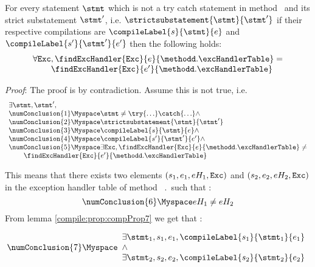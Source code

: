 \begin{compProp8}
  For every statement $\stmt$ which is not a try catch statement  in method \methodd \  and  its strict substatement $\stmt'$, i.e. 
$\strictsubstatement{\stmt}{\stmt'} $
if their respective compilations are  $\compileLabel{s}{\stmt}{e}$ and  $\compileLabel{s'}{\stmt'}{e'}$ then the following holds:
$$ \begin{array}{l}
          \forall \mbox{\rm\tt{Exc}}, \findExcHandler{\mbox{\rm\tt{Exc}} }{e}{\methodd.\excHandlerTable} = \\
	  \phantom{\forall \mbox{\rm\tt{Exc}} }\findExcHandler{\mbox{\rm\tt{Exc}} }{e'}{\methodd.\excHandlerTable} 
   \end{array}
$$

\end{compProp8}
\textit{Proof}:
The proof is by contradiction. Assume this is not true, i.e.
 $$\begin{array}{l} \exists \stmt, \stmt' ,   \\
       \numConclusion{1}    \Myspace \stmt \neq \try \{ \ldots \} \catch \{ \ldots \} \wedge \\
       \numConclusion{2}   \Myspace  \strictsubstatement{\stmt}{\stmt'} \\
       \numConclusion{3}  \Myspace  \compileLabel{s}{\stmt}{e} \wedge \\
       \numConclusion{4} \Myspace  \compileLabel{s'}{\stmt'}{e'} \wedge \\
       \numConclusion{5}  \Myspace \exists  \mbox{\rm\tt{Exc}}, \findExcHandler{\mbox{\rm\tt{Exc}} }{e}{\methodd.\excHandlerTable} \neq \\
                                            \phantom{\exists \mbox{\rm\tt{Exc}} }\findExcHandler{\mbox{\rm\tt{Exc}} }{e'}{\methodd.\excHandlerTable}    
\end{array}
$$

This means that there exists two elements $   (s_1,e_1, eH_1, \mbox{\rm\texttt{Exc}} ) $  and
$   (s_2,e_2, eH_2, \mbox{\rm\texttt{Exc}} )$  in the exception handler table of method \methodd \ \methodd.\excHandlerTable \  such that   : 
$$ \numConclusion{6}  \Myspace eH_1 \neq eH_2 $$
From lemma \ref{compile:prop:compProp7} we get that :

$$ \numConclusion{7}  \Myspace \begin{array}{l}
        \exists \stmt_1, s_1, e_1, \compileLabel{s_1}{\stmt_1}{e_1} \\
	\wedge \\
	\exists \stmt_2, s_2, e_2,\compileLabel{s_2}{\stmt_2}{e_2}
\end{array}	 $$


